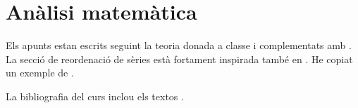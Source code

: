 \documentclass[../segon.tex]{subfiles}
\begin{document}
\part{Anàlisi matemàtica}



\printbibliography
Els apunts estan escrits seguint la teoria donada a classe i complementats amb \cite{ApuntsMorelo}.
La secció de reordenació de sèries està fortament inspirada també en \cite{HickmanRiemannSeriesTheoremNotes}.
He copiat un exemple de \cite{KeithDifferentiatingUnderIntegralSignNotes}.

La bibliografia del curs inclou els textos \cite{GalindoGuiaPracticaCalculoInfinitesimal,OrtegaIntroduccioAnalisiMatematica,PerelloCalculInfinitesimal,RudinPrinciplesOfMathematicalAnalysis,TolstovFourier}.
\end{document}
